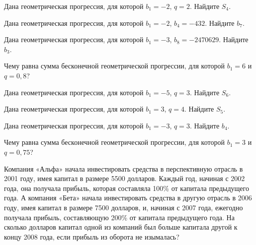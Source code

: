 \documentclass[4apaper]{article}
\begin{document}
\begin{taskBN}{39}
Дана геометрическая прогрессия, для которой $b_1 = -2$, $q=2$. Найдите $S_{4}$.
\end{taskBN}

\begin{taskBN}{40}
Дана геометрическая прогрессия, для которой $b_1 = -2$, $b_{4}=-432$. Найдите $b_{7}$.
\end{taskBN}

\begin{taskBN}{41}
Дана геометрическая прогрессия, для которой $b_1 = -3$, $b_{8}=-2470629$. Найдите $b_{3}$.
\end{taskBN}

\begin{taskBN}{42}
Чему равна сумма бесконечной геометрической прогрессии, для которой $b_1 = 6$ и $q=0,8$?
\end{taskBN}

\begin{taskBN}{43}
Дана геометрическая прогрессия, для которой $b_1 = -5$, $q=3$. Найдите $S_{6}$.
\end{taskBN}

\begin{taskBN}{44}
Дана геометрическая прогрессия, для которой $b_1 = 3$, $q=4$. Найдите $S_{5}$.
\end{taskBN}

\begin{taskBN}{45}
Дана геометрическая прогрессия, для которой $b_1 = -3$, $q=3$. Найдите $b_{4}$.
\end{taskBN}

\begin{taskBN}{46}
Чему равна сумма бесконечной геометрической прогрессии, для которой $b_1 = 3$ и $q=0,75$?
\end{taskBN}

\begin{taskBN}{47}
Компания «Альфа» начала инвестировать средства в перспективную отрасль в 2001 году, имея капитал в размере 5500 долларов. Каждый год, начиная с 2002 года, она получала прибыль, которая составляла 100\% от капитала предыдущего года. А компания «Бета» начала инвестировать средства в другую отрасль в 2006 году, имея капитал в размере 7500 долларов, и, начиная с 2007 года, ежегодно получала прибыль, составляющую 200\% от капитала предыдущего года. На сколько долларов капитал одной из компаний был больше капитала другой к концу 2008 года, если прибыль из оборота не изымалась?
\end{taskBN}
\end{document}
